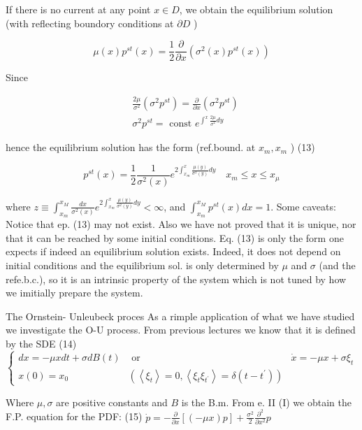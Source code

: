 If there is no current at any point $x \in D$, we obtain the equilibrium solution (with reflecting boundory conditions at $\partial D$ )

$$ \mu(x) p^{s t}(x)=\frac{1}{2} \frac{\partial}{\partial x}\left(\sigma^{2}(x) p^{s t}(x)\right) $$

Since

$$ \begin{aligned}
& \frac{2 \mu}{\sigma^{2}}\left(\sigma^{2} p^{s t}\right)=\frac{\partial}{\partial x}\left(\sigma^{2} p^{s t}\right) \\ & \sigma^{2} p^{s t}=\text { const } e^{\int^{x} \frac{2 \mu}{\sigma^{2}} d y}
\end{aligned}
$$ 

hence the equilibrium solution has the form (ref.bound. at $x_{m}, x_{m}$ )
(13)

$$ p^{s t}(x)=\frac{1}{2} \frac{1}{\sigma^{2}(x)} e^{2 \int_{x_{m}}^{x} \frac{\mu(y)}{\sigma^{2}(y)} d y} \quad x_{m} \leq x \leq x_{\mu} $$

where $z \equiv \int_{x_{m}}^{x_{M}} \frac{d x}{\sigma^{2}(x)} e^{2 \int_{x_{m}}^{x} \frac{\mu(y)}{\sigma^{2}(y)} d y}<\infty$, and $\int_{x_{m}}^{x_{M}} p^{s t}(x) d x=1$.
Some caveats:
Notice that ep. (13) may not exist. Also we have not proved that it is unique, nor that it can be reached by some initial conditions.
Eq. (13) is only the form one expects if indeed an equilibrium solution exists. Indeed, it does not depend on initial conditions and the equilibrium sol. is only determined by $\mu$ and $\sigma$ (and the refe.b.c.), so it is an intrinsic property of the system which is not tuned by how we imitially prepare the system.

The Ornstein- Unleubeck proces
As a rimple application of what we have studied we investigate the O-U process. From previous lectures we know that it is defined by the SDE
(14) $\left\{\begin{array}{lll}d x=-\mu x d t+\sigma d B(t) & \text { or } & \dot{x}=-\mu x+\sigma \xi_{t} \\ x(0)=x_{0} & \left(\left\langle\xi_{t}\right\rangle=0,\left\langle\xi_{t} \xi_{t^{\prime}}\right\rangle=\delta\left(t-t^{\prime}\right)\right)\end{array}\right.$

Where $\mu, \sigma$ are positive constants and $B$ is the B.m. From e. II (I) we obtain the F.P. equation for the PDF:
(15) $\dot{p}=-\frac{\partial}{\partial x}[(-\mu x) p]+\frac{\sigma^{2}}{2} \frac{\partial^{2}}{\partial x^{2}} p$

